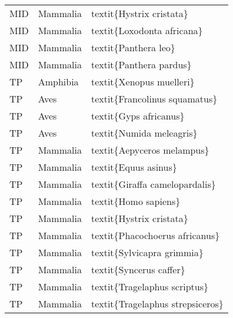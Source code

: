 \begin{longtable}{lll}
  MID & Mammalia & textit\{Hystrix cristata\} \\ 
  MID & Mammalia & textit\{Loxodonta africana\} \\ 
  MID & Mammalia & textit\{Panthera leo\} \\ 
  MID & Mammalia & textit\{Panthera pardus\} \\ 
  TP & Amphibia & textit\{Xenopus muelleri\} \\ 
  TP & Aves & textit\{Francolinus squamatus\} \\ 
  TP & Aves & textit\{Gyps africanus\} \\ 
  TP & Aves & textit\{Numida meleagris\} \\ 
  TP & Mammalia & textit\{Aepyceros melampus\} \\ 
  TP & Mammalia & textit\{Equus asinus\} \\ 
  TP & Mammalia & textit\{Giraffa camelopardalis\} \\ 
  TP & Mammalia & textit\{Homo sapiens\} \\ 
  TP & Mammalia & textit\{Hystrix cristata\} \\ 
  TP & Mammalia & textit\{Phacochoerus africanus\} \\ 
  TP & Mammalia & textit\{Sylvicapra grimmia\} \\ 
  TP & Mammalia & textit\{Syncerus caffer\} \\ 
  TP & Mammalia & textit\{Tragelaphus scriptus\} \\ 
  TP & Mammalia & textit\{Tragelaphus strepsiceros\} \\ 
   \hline
\hline
\end{longtable}

